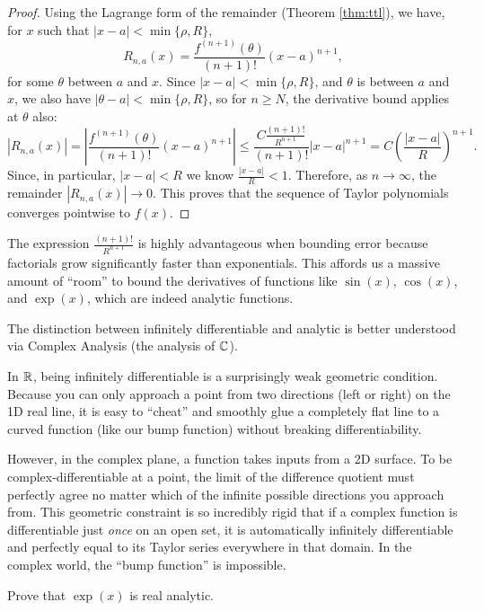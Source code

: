 \documentclass[../analysis1.tex]{subfiles}
\begin{document}
\begin{proof}
    Using the Lagrange form of the remainder (Theorem \ref{thm:ttl}), we have, for $x$ such that $|x-a|<\min\{\rho,R\}$,
    \[R_{n,a}(x)=\frac{f^{(n+1)}(\theta)}{(n+1)!}(x-a)^{n+1},\]
    for some $\theta$ between $a$ and $x$. Since $|x-a|<\min\{\rho,R\}$, and $\theta$ is between $a$ and $x$, we also have $|\theta-a|<\min\{\rho,R\}$, so for $n\ge N$, the derivative bound applies at $\theta$ also:
    \[
        |R_{n,a}(x)| = \left| \frac{f^{(n+1)}(\theta)}{(n+1)!} (x-a)^{n+1} \right| \le \frac{C \frac{(n+1)!}{R^{n+1}}}{(n+1)!} |x-a|^{n+1} = C \left( \frac{|x-a|}{R} \right)^{n+1}.
    \]
    Since, in particular, $|x-a|<R$ we know $\frac{|x-a|}{R} < 1$. Therefore, as $n \to \infty$, the remainder $|R_{n,a}(x)| \to 0$. This proves that the sequence of Taylor polynomials converges pointwise to $f(x)$.
\end{proof}

\begin{remark}
    The expression $\frac{(n+1)!}{R^{n+1}}$ is highly advantageous when bounding error because factorials grow significantly faster than exponentials. This affords us a massive amount of ``room'' to bound the derivatives of functions like $\sin(x)$, $\cos(x)$, and $\exp(x)$, which are indeed analytic functions.
\end{remark}

The distinction between infinitely differentiable and analytic is better understood via Complex Analysis (the analysis of $\mathbb{C}$). 
    
In $\mathbb{R}$, being infinitely differentiable is a surprisingly weak geometric condition. Because you can only approach a point from two directions (left or right) on the 1D real line, it is easy to ``cheat'' and smoothly glue a completely flat line to a curved function (like our bump function) without breaking differentiability. 
    
However, in the complex plane, a function takes inputs from a 2D surface. To be complex-differentiable at a point, the limit of the difference quotient must perfectly agree no matter which of the infinite possible directions you approach from. This geometric constraint is so incredibly rigid that if a complex function is differentiable just \textit{once} on an open set, it is automatically infinitely differentiable and perfectly equal to its Taylor series everywhere in that domain. In the complex world, the ``bump function'' is impossible.

\begin{exercise*}
    Prove that $\exp(x)$ is real analytic.
\end{exercise*}
\end{document}
